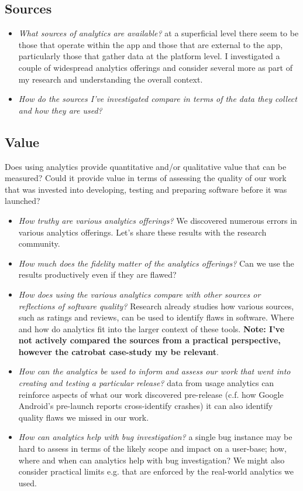 \subsection{Sources}
\begin{itemize}
    \item \emph{What sources of analytics are available?} at a superficial level there seem to be those that operate within the app and those that are external to the app, particularly those that gather data at the platform level. I investigated a couple of widespread analytics offerings and consider several more as part of my research and understanding the overall context.
    \item \emph{How do the sources I've investigated compare in terms of the data they collect and how they are used?}
\end{itemize}

\subsection{Value}
Does using analytics provide quantitative and/or qualitative value that can be measured? Could it provide value in terms of assessing the quality of our work that was invested into developing, testing and preparing software before it was launched?
\begin{itemize}
    \item \emph{How truthy are various analytics offerings?} We discovered numerous errors in various analytics offerings. Let's share these results with the research community.
    \item \emph{How much does the fidelity matter of the analytics offerings?} Can we use the results productively even if they are flawed?
    \item \emph{How does using the various analytics compare with other sources or reflections of software quality?} Research already studies how various sources, such as ratings and reviews, can be used to identify flaws in software. Where and how do analytics fit into the larger context of these tools. \textbf{Note: I've not actively compared the sources from a practical perspective, however the catrobat case-study my be relevant}.
    \item \emph{How can the analytics be used to inform and assess our work that went into creating and testing a particular release?} data from usage analytics can reinforce aspects of what our work discovered pre-release (c.f. how Google Android's pre-launch reports cross-identify crashes) it can also identify quality flaws we missed in our work.
    \item \emph{How can analytics help with bug investigation?} a single bug instance may be hard to assess in terms of the likely scope and impact on a user-base; how, where and when can analytics help with bug investigation? We might also consider practical limits e.g. that are enforced by the real-world analytics we used. 
\end{itemize}

